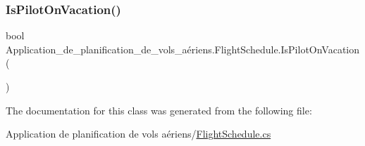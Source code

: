 \subsubsection{\texorpdfstring{Is\+Pilot\+On\+Vacation()}{IsPilotOnVacation()}}
{\footnotesize\ttfamily bool Application\+\_\+de\+\_\+planification\+\_\+de\+\_\+vols\+\_\+aériens.\+Flight\+Schedule.\+Is\+Pilot\+On\+Vacation (\begin{DoxyParamCaption}{ }\end{DoxyParamCaption})}



The documentation for this class was generated from the following file\+:\begin{DoxyCompactItemize}
\item 
Application de planification de vols aériens/\hyperlink{_flight_schedule_8cs}{Flight\+Schedule.\+cs}\end{DoxyCompactItemize}
